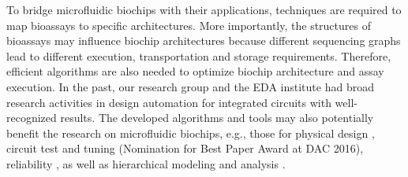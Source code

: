 To bridge microfluidic biochips with their applications, 
techniques are required to map bioassays to specific
architectures. More importantly, the structures of bioassays may influence
biochip architectures because different sequencing graphs lead to different
execution, transportation and storage requirements.
Therefore, efficient algorithms are also needed to optimize biochip
architecture and assay execution. 
In the past, our research group and the EDA institute 
had broad research activities in design automation for integrated circuits with
well-recognized results. The developed algorithms and tools may also
potentially benefit the research on microfluidic biochips, e.g., those for
physical design \cite{Spindler2008}, circuit test and tuning \cite{ZhangLS16} 
(Nomination for Best Paper Award at DAC 2016),
reliability \cite{Barke2015}, as well as hierarchical modeling and analysis
\cite{Li2013}. 











